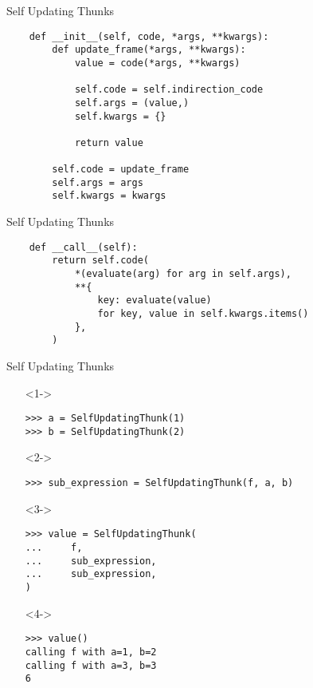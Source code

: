 \documentclass{beamer}
\begin{document}
\begin{frame}[fragile]{Self Updating Thunks}
  \begin{verbatim}
    def __init__(self, code, *args, **kwargs):
        def update_frame(*args, **kwargs):
            value = code(*args, **kwargs)

            self.code = self.indirection_code
            self.args = (value,)
            self.kwargs = {}

            return value

        self.code = update_frame
        self.args = args
        self.kwargs = kwargs
  \end{verbatim}
\end{frame}

\begin{frame}[fragile]{Self Updating Thunks}
  \begin{verbatim}
    def __call__(self):
        return self.code(
            *(evaluate(arg) for arg in self.args),
            **{
                key: evaluate(value)
                for key, value in self.kwargs.items()
            },
        )
  \end{verbatim}
\end{frame}

\begin{frame}[fragile]{Self Updating Thunks}
  \begin{itemize}
  \item[]<1-> \begin{verbatim}
>>> a = SelfUpdatingThunk(1)
>>> b = SelfUpdatingThunk(2)
    \end{verbatim}
  \item[]<2-> \begin{verbatim}
>>> sub_expression = SelfUpdatingThunk(f, a, b)
    \end{verbatim}
  \item[]<3-> \begin{verbatim}
>>> value = SelfUpdatingThunk(
...     f,
...     sub_expression,
...     sub_expression,
)
    \end{verbatim}
  \item[]<4-> \begin{verbatim}
>>> value()
calling f with a=1, b=2
calling f with a=3, b=3
6
    \end{verbatim}
  \end{itemize}
\end{frame}
\end{document}
